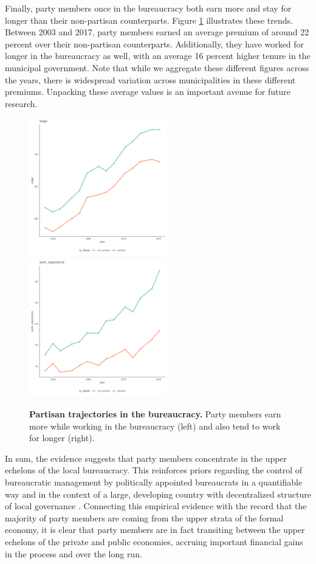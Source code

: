 Finally, party members once in the bureaucracy both earn more and stay for longer than their non-partisan counterparts. Figure \ref{fig:partisan_trajectory} illustrates these trends. Between 2003 and 2017, party members earned an average premium of around 22 percent over their non-partisan counterparts. Additionally, they have worked for longer in the bureaucracy as well, with an average 16 percent higher tenure in the municipal government. Note that while we aggregate these different figures across the years, there is widespread variation across municipalities in these different premiums. Unpacking these average values is an important avenue for future research.

\begin{figure}
    \centering
    \includegraphics[width = 6cm, height = 6cm]{chapters/chapter_3/figures/turnover/plot_wage.pdf}
    \includegraphics[width = 6cm, height = 6cm]{chapters/chapter_3/figures/turnover/plot_work_experience.pdf}
    \caption{\textbf{Partisan trajectories in the bureaucracy.} Party members earn more while working in the bureaucracy (left) and also tend to work for longer (right).}
    \label{fig:partisan_trajectory}
\end{figure}

In sum, the evidence suggests that party members concentrate in the upper echelons of the local bureaucracy. This reinforces priors regarding the control of bureaucratic management by politically appointed bureaucrats in a quantifiable way and in the context of a large, developing country with decentralized structure of local governance \citep{lewis2010politics}. Connecting this empirical evidence with the record that the majority of party members are coming from the upper strata of the formal economy, it is clear that party members are in fact transiting between the upper echelons of the private and public economies, accruing important financial gains in the process and over the long run.

